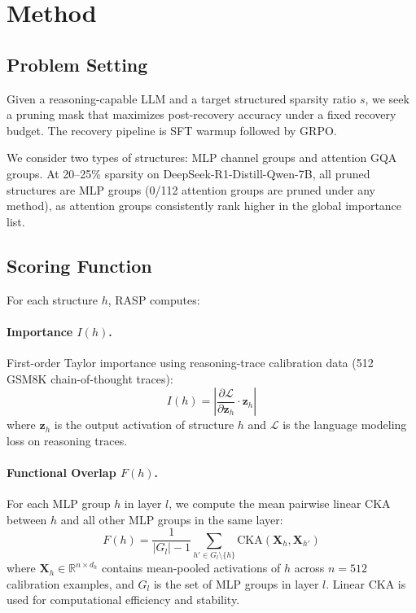 \documentclass[11pt,a4paper]{article}
\newcommand{\method}{RASP}
\newcommand{\importance}{I(h)}
\newcommand{\overlap}{F(h)}
\begin{document}
\section{Method}
\label{sec:method}

\subsection{Problem Setting}

Given a reasoning-capable LLM and a target structured sparsity ratio $s$, we seek a pruning mask that maximizes post-recovery accuracy under a fixed recovery budget. The recovery pipeline is SFT warmup followed by GRPO.

We consider two types of structures: MLP channel groups and attention GQA groups. At 20--25\% sparsity on DeepSeek-R1-Distill-Qwen-7B, all pruned structures are MLP groups (0/112 attention groups are pruned under any method), as attention groups consistently rank higher in the global importance list.

\subsection{Scoring Function}

For each structure $h$, \method{} computes:

\paragraph{Importance $\importance{}$.} First-order Taylor importance using reasoning-trace calibration data (512 GSM8K chain-of-thought traces):
\begin{equation}
\importance{} = \left| \frac{\partial \mathcal{L}}{\partial \mathbf{z}_h} \cdot \mathbf{z}_h \right|
\end{equation}
where $\mathbf{z}_h$ is the output activation of structure $h$ and $\mathcal{L}$ is the language modeling loss on reasoning traces.

\paragraph{Functional Overlap $\overlap{}$.} For each MLP group $h$ in layer $l$, we compute the mean pairwise linear CKA between $h$ and all other MLP groups in the same layer:
\begin{equation}
\overlap{} = \frac{1}{|G_l| - 1} \sum_{h' \in G_l \setminus \{h\}} \text{CKA}(\mathbf{X}_h, \mathbf{X}_{h'})
\end{equation}
where $\mathbf{X}_h \in \mathbb{R}^{n \times d_h}$ contains mean-pooled activations of $h$ across $n=512$ calibration examples, and $G_l$ is the set of MLP groups in layer $l$. Linear CKA is used for computational efficiency and stability.
\end{document}
